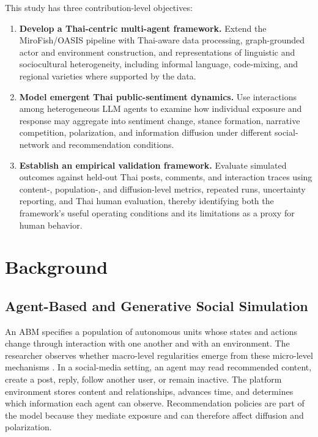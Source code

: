 \documentclass[10pt,twocolumn]{article}
\begin{document}
This study has three contribution-level objectives:

\begin{enumerate}
    \item \textbf{Develop a Thai-centric multi-agent framework.}
    Extend the MiroFish/OASIS pipeline with Thai-aware data processing,
    graph-grounded actor and environment construction, and representations of
    linguistic and sociocultural heterogeneity, including informal language,
    code-mixing, and regional varieties where supported by the data.

    \item \textbf{Model emergent Thai public-sentiment dynamics.}
    Use interactions among heterogeneous LLM agents to examine how individual
    exposure and response may aggregate into sentiment change, stance
    formation, narrative competition, polarization, and information diffusion
    under different social-network and recommendation conditions.

    \item \textbf{Establish an empirical validation framework.}
    Evaluate simulated outcomes against held-out Thai posts, comments, and
    interaction traces using content-, population-, and diffusion-level
    metrics, repeated runs, uncertainty reporting, and Thai human evaluation,
    thereby identifying both the framework's useful operating conditions and
    its limitations as a proxy for human behavior.
\end{enumerate}

\section{Background}
\label{sec:background}

\subsection{Agent-Based and Generative Social Simulation}

An ABM specifies a population of autonomous units whose states and actions
change through interaction with one another and with an environment. The
researcher observes whether macro-level regularities emerge from these
micro-level mechanisms \citep{macal2010tutorial}. In a social-media setting,
an agent may read recommended content, create a post, reply, follow another
user, or remain inactive. The platform environment stores content and
relationships, advances time, and determines which information each agent can
observe. Recommendation policies are part of the model because they mediate
exposure and can therefore affect diffusion and polarization.
\end{document}
